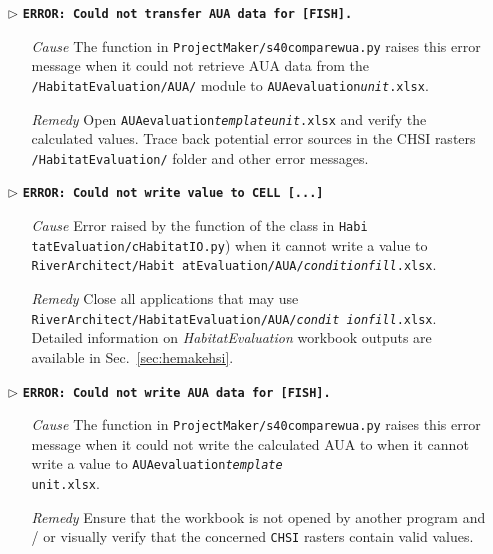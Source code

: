 \begin{itemize}
	\item[$\triangleright$]\textbf{\texttt{ERROR: Could not transfer AUA data for [FISH].}}
	\begin{itemize}
		\item[\textit{Cause}\hspace{0.27cm}] The  function in \texttt{ProjectMaker/s40{\myUnderscore}compare{\myUnderscore}wua.py} raises this error message when it could not retrieve AUA data from the \texttt{/HabitatEvaluation/AUA/} module to  \texttt{AUA{\myUnderscore}evaluation\textit{{\myUnderscore}unit}.xlsx}.
		\item[\textit{Remedy}] Open \texttt{AUA{\myUnderscore}evaluation\textit{{\myUnderscore}template{\myUnderscore}unit}.xlsx} and verify the calculated values. Trace back potential error sources in the CHSI rasters \texttt{/HabitatEvaluation/} folder and other error messages.\\
	\end{itemize}	
	
	\item[$\triangleright$]\textbf{\texttt{ERROR: Could not write value to CELL [...]}}
	\begin{itemize}
		\item[\textit{Cause}\hspace{0.27cm}] Error raised by the  function of the  class in \texttt{Habi tatEvaluation/cHabitatIO.py}) when it cannot write a value to \texttt{RiverArchitect/Habit atEvaluation/AUA/\textit{condition{\myUnderscore}fill}.xlsx}.
		\item[\textit{Remedy}] Close all applications that may use \texttt{RiverArchitect/HabitatEvaluation/AUA/\textit{condit ion}{\myUnderscore}\textit{fill}.xlsx}. Detailed information on \textit{HabitatEvaluation} workbook outputs are available in Sec.~\ref{sec:hemakehsi}.\\
	\end{itemize}
	
	\item[$\triangleright$]\textbf{\texttt{ERROR: Could not write AUA data for [FISH].}}
	\begin{itemize}
		\item[\textit{Cause}\hspace{0.27cm}] The  function in \texttt{ProjectMaker/s40{\myUnderscore}compare{\myUnderscore}wua.py} raises this error message when it could not write the calculated AUA to when it cannot write a value to \texttt{AUA{\myUnderscore}evaluation\textit{{\myUnderscore}template{\myUnderscore}}\\\texttt{unit}.xlsx}.
		\item[\textit{Remedy}] Ensure that the workbook is not opened by another program and / or visually verify that the concerned \texttt{CHSI} rasters contain valid values.\\
	\end{itemize}
	

\end{itemize}

